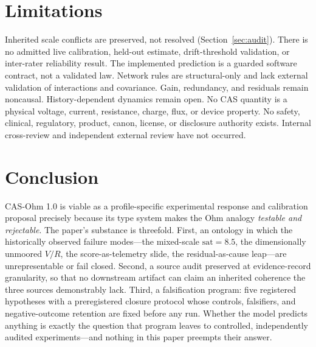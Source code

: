 \documentclass[11pt]{amsart}
\theoremstyle{definition}
\theoremstyle{remark}
\begin{document}
\section{Limitations}\label{sec:limits}

Inherited scale conflicts are preserved, not resolved (Section~\ref{sec:audit}). There is no admitted live calibration, held-out estimate, drift-threshold validation, or inter-rater reliability result. The implemented prediction is a guarded software contract, not a validated law. Network rules are structural-only and lack external validation of interactions and covariance. Gain, redundancy, and residuals remain noncausal. History-dependent dynamics remain open. No CAS quantity is a physical voltage, current, resistance, charge, flux, or device property. No safety, clinical, regulatory, product, canon, license, or disclosure authority exists. Internal cross-review and independent external review have not occurred.

\section{Conclusion}

CAS-Ohm 1.0 is viable as a profile-specific experimental response and calibration proposal precisely because its type system makes the Ohm analogy \emph{testable and rejectable}. The paper's substance is threefold. First, an ontology in which the historically observed failure modes---the mixed-scale $\mathrm{sat}=8.5$, the dimensionally unmoored $V/R$, the score-as-telemetry slide, the residual-as-cause leap---are unrepresentable or fail closed. Second, a source audit preserved at evidence-record granularity, so that no downstream artifact can claim an inherited coherence the three sources demonstrably lack. Third, a falsification program: five registered hypotheses with a preregistered closure protocol whose controls, falsifiers, and negative-outcome retention are fixed before any run. Whether the model predicts anything is exactly the question that program leaves to controlled, independently audited experiments---and nothing in this paper preempts their answer.
\end{document}
